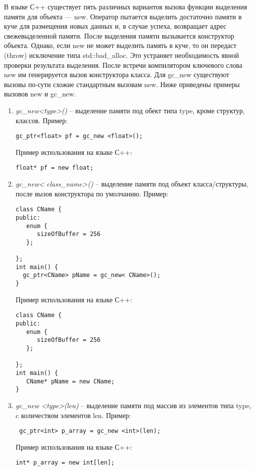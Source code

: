 В языке С++ существует пять различных вариантов вызова функции выделения памяти для объекта --- new. Оператор пытается выделить достаточно памяти в куче для размещения новых данных и, в случае успеха, возвращает адрес свежевыделенной памяти. После выделения памяти вызывается конструктор объекта. Однако, если new не может выделить память в куче, то он передаст (throw) исключение типа std::bad\_alloc. Это устраняет необходимость явной проверки результата выделения. После встречи компилятором ключевого слова new им генерируется вызов конструктора класса.
Для gc\_new существуют вызовы по-сути схожие стандартным вызовам new. Ниже приведены примеры вызовов new и gc_new.
\begin {enumerate}
\item \textit{gc\_new<type>()} --  выделение памяти под обект типа type, кроме структур, классов. 
Пример:
 \begin{lstlisting}
gc_ptr<float> pf = gc_new <float>();
\end{lstlisting}

Пример использования на языке С++:
\begin{lstlisting}
float* pf = new float;
\end{lstlisting}

\item \textit{gc\_new< class\_name>()} -- выделение памяти под объект класса/структуры, после вызов конструктора по умолчанию. 
Пример:
 \begin{lstlisting}
class CName {
public:
   enum {
      sizeOfBuffer = 256
   };

};
int main() {
  gc_ptr<CName> pName = gc_new< CName>();
}
\end{lstlisting}

Пример использования на языке С++:
\begin{lstlisting}
class CName {
public:
   enum {
      sizeOfBuffer = 256
   };

};
int main() {
   CName* pName = new CName;
}
\end{lstlisting}

\item \textit{gc\_new <type>(len)} -- выделение памяти под массив из элементов типа type, c количеством элементов len. 
Пример:
 \begin{lstlisting}
 gc_ptr<int> p_array = gc_new <int>(len);
\end{lstlisting}
Пример использования на языке С++:

\begin{lstlisting}
int* p_array = new int[len];
\end{lstlisting}


\end{enumerate}
